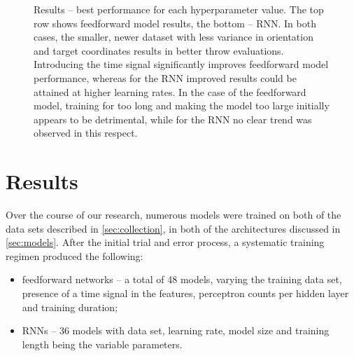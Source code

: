 \documentclass{article}
\begin{document}
\begin{figure}[!hbt]
	\centering
	\caption{Results -- best performance for each hyperparameter value. The top row shows feedforward model results, the bottom -- RNN. In both cases, the smaller, newer dataset with less variance in orientation and target coordinates results in better throw evaluations.  Introducing the time signal significantly improves feedforward model performance, whereas for the RNN improved results could be attained at higher learning rates. In the case of the feedforward model, training for too long and making the model too large initially appears to be detrimental, while for the RNN no clear trend was observed in this respect.}
	\label{fig:rnn_naive_best}
\end{figure}

\section{Results}
\label{sec:results}

Over the course of our research, numerous models were trained on both of the data sets described in \ref{sec:collection}, in both of the architectures discussed in \ref{sec:models}. After the initial trial and error process, a systematic training regimen produced the following:

\begin{itemize}
	\item feedforward networks -- a total of 48 models, varying the training data set, presence of a time signal in the features, perceptron counts per hidden layer and training duration;
	\item RNNs -- 36 models with data set, learning rate, model size and training length being the variable parameters.
\end{itemize}
\end{document}
